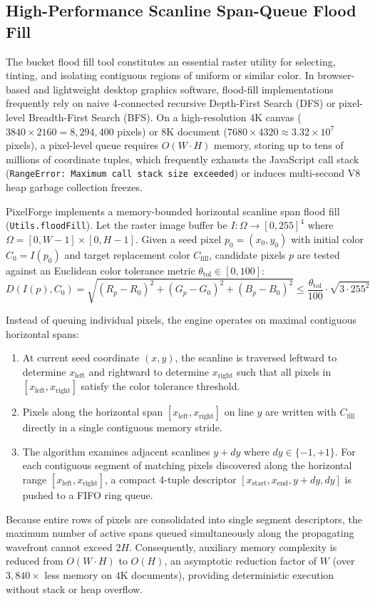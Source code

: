\documentclass[10pt,journal,compsoc]{IEEEtran}
\begin{document}
\subsection{High-Performance Scanline Span-Queue Flood Fill}
The bucket flood fill tool constitutes an essential raster utility for selecting, tinting, and isolating contiguous regions of uniform or similar color. In browser-based and lightweight desktop graphics software, flood-fill implementations frequently rely on naive 4-connected recursive Depth-First Search (DFS) or pixel-level Breadth-First Search (BFS). On a high-resolution $4\text{K}$ canvas ($3840 \times 2160 = 8{,}294{,}400$ pixels) or $8\text{K}$ document ($7680 \times 4320 \approx 3.32 \times 10^7$ pixels), a pixel-level queue requires $O(W \cdot H)$ memory, storing up to tens of millions of coordinate tuples, which frequently exhausts the JavaScript call stack (\texttt{RangeError: Maximum call stack size exceeded}) or induces multi-second V8 heap garbage collection freezes.

PixelForge implements a memory-bounded horizontal scanline span flood fill (\texttt{Utils.floodFill}). Let the raster image buffer be $I: \Omega \to [0, 255]^4$ where $\Omega = [0, W-1] \times [0, H-1]$. Given a seed pixel $p_0 = (x_0, y_0)$ with initial color $C_0 = I(p_0)$ and target replacement color $C_{\text{fill}}$, candidate pixels $p$ are tested against an Euclidean color tolerance metric $\theta_{\text{tol}} \in [0, 100]$:
\begin{equation}
D(I(p), C_0) = \sqrt{(R_p - R_0)^2 + (G_p - G_0)^2 + (B_p - B_0)^2} \le \frac{\theta_{\text{tol}}}{100} \cdot \sqrt{3 \cdot 255^2}
\end{equation}

Instead of queuing individual pixels, the engine operates on maximal contiguous horizontal spans:
\begin{enumerate}
    \item At current seed coordinate $(x, y)$, the scanline is traversed leftward to determine $x_{\text{left}}$ and rightward to determine $x_{\text{right}}$ such that all pixels in $[x_{\text{left}}, x_{\text{right}}]$ satisfy the color tolerance threshold.
    \item Pixels along the horizontal span $[x_{\text{left}}, x_{\text{right}}]$ on line $y$ are written with $C_{\text{fill}}$ directly in a single contiguous memory stride.
    \item The algorithm examines adjacent scanlines $y + dy$ where $dy \in \{-1, +1\}$. For each contiguous segment of matching pixels discovered along the horizontal range $[x_{\text{left}}, x_{\text{right}}]$, a compact 4-tuple descriptor $[x_{\text{start}}, x_{\text{end}}, y + dy, dy]$ is pushed to a FIFO ring queue.
\end{enumerate}
Because entire rows of pixels are consolidated into single segment descriptors, the maximum number of active spans queued simultaneously along the propagating wavefront cannot exceed $2H$. Consequently, auxiliary memory complexity is reduced from $O(W \cdot H)$ to $O(H)$, an asymptotic reduction factor of $W$ (over $3{,}840\times$ less memory on $4\text{K}$ documents), providing deterministic execution without stack or heap overflow.
\end{document}
